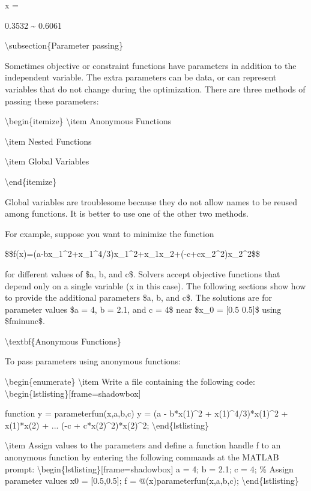 \documentclass[10pt,math=newtx,citestyle=gb7714-2015,bibstyle=gb7714-2015]{elegantbook}
\begin{document}
	
	x =
	
	0.3532  \~{}  0.6061
	
	\textbackslash{}subsection\{Parameter passing\}
	
	Sometimes objective or constraint functions have parameters in addition to the independent variable. The extra parameters can be data, or can represent variables that do not change during the optimization. There are three methods of passing these parameters:
	
	\textbackslash{}begin\{itemize\}
	\textbackslash{}item Anonymous Functions
	
	\textbackslash{}item Nested Functions
	
	\textbackslash{}item Global Variables
	
	
	\textbackslash{}end\{itemize\}
	
	Global variables are troublesome because they do not allow names to be reused among functions. It is better to use one of the other two methods.
	
	For example, suppose you want to minimize the function
	
	\$\$f(x)=(a-bx\_1\^{}2+x\_1\^{}4/3)x\_1\^{}2+x\_1x\_2+(-c+cx\_2\^{}2)x\_2\^{}2\$\$
	
	for different values of \$a, b, and c\$. Solvers accept objective functions that depend only on a single variable (x in this case). The following sections show how to provide the additional parameters \$a, b, and c\$. The solutions are for parameter values \$a = 4, b = 2.1, and c = 4\$ near \$x\_0 = [0.5 0.5]\$ using \$fminunc\$.
	
	\textbackslash{}textbf\{Anonymous Functions\}
	
	To pass parameters using anonymous functions:
	
	\textbackslash{}begin\{enumerate\}
	\textbackslash{}item Write a file containing the following code:
	\textbackslash{}begin\{lstlisting\}[frame=shadowbox]
	
	function y = parameterfun(x,a,b,c)
	y = (a - b*x(1)\^{}2 + x(1)\^{}4/3)*x(1)\^{}2 + x(1)*x(2) + ...
	(-c + c*x(2)\^{}2)*x(2)\^{}2;
	\textbackslash{}end\{lstlisting\}
	
	\textbackslash{}item Assign values to the parameters and define a function handle f to an anonymous function by entering the following commands at the MATLAB prompt:
	\textbackslash{}begin\{lstlisting\}[frame=shadowbox]
	a = 4; b = 2.1; c = 4; \% Assign parameter values
	x0 = [0.5,0.5];
	f = @(x)parameterfun(x,a,b,c);
	\textbackslash{}end\{lstlisting\}
	
\end{document}

